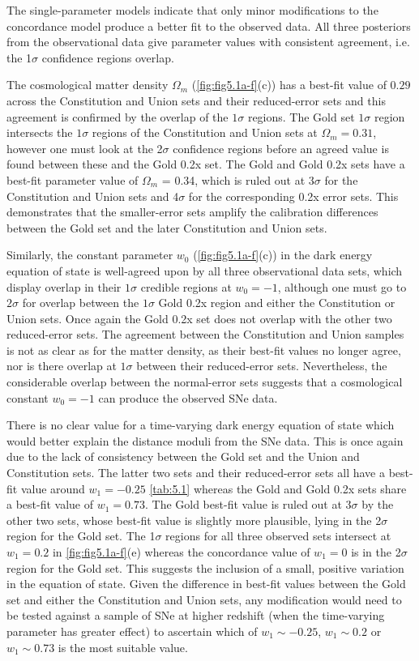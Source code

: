 The single-parameter models indicate that only minor modifications to the concordance model produce a better fit to the observed data. All three posteriors from the observational data give parameter values with consistent agreement, i.e. the 1$\sigma$ confidence regions overlap. 

The cosmological matter density $\Omega_m$ (\cref{fig:fig5.1a-f}(c)) has a best-fit value of $0.29$ across the Constitution and Union sets and their reduced-error sets and this agreement is confirmed by the overlap of the $1\sigma$ regions. The Gold set $1\sigma$ region intersects the $1\sigma$ regions of the Constitution and Union sets at $\Omega_m = 0.31$, however one must look at the 2$\sigma$ confidence regions before an agreed value is found between these and the Gold 0.2x set. The Gold and Gold 0.2x sets have a best-fit parameter value of $\Omega_m$ = 0.34, which is ruled out at 3$\sigma$ for the Constitution and Union sets and 4$\sigma$ for the corresponding 0.2x error sets. This demonstrates that the smaller-error sets amplify the calibration differences between the Gold set and the later Constitution and Union sets.

Similarly, the constant parameter $w_0$ (\cref{fig:fig5.1a-f}(c)) in the dark energy equation of state is well-agreed upon by all three observational data sets, which display overlap in their $1\sigma$ credible regions at $w_0 = -1$, although one must go to $2\sigma$ for overlap between the $1\sigma$ Gold 0.2x region and either the Constitution or Union sets. Once again the Gold 0.2x set does not overlap with the other two reduced-error sets. The agreement between the Constitution and Union samples is not as clear as for the matter density, as their best-fit values no longer agree, nor is there overlap at $1\sigma$ between their reduced-error sets. Nevertheless, the considerable overlap between the normal-error sets suggests that a cosmological constant $w_0 = -1$ can produce the observed SNe data.
   
There is no clear value for a time-varying dark energy equation of state which would better explain the distance moduli from the SNe data. This is once again due to the lack of consistency between the Gold set and the Union and Constitution sets. The latter two sets and their reduced-error sets all have a best-fit value around $w_1 = -0.25$ \cref{tab:5.1} whereas the Gold and Gold 0.2x sets share a best-fit value of $w_1 = 0.73$. The Gold best-fit value is ruled out at $3\sigma$ by the other two sets, whose best-fit value is slightly more plausible, lying in the 2$\sigma$ region for the Gold set. The 1$\sigma$ regions for all three observed sets intersect at $w_1 = 0.2$ in \cref{fig:fig5.1a-f}(e) whereas the concordance value of $w_1 = 0$ is in the 2$\sigma$ region for the Gold set. This suggests the inclusion of a small, positive variation in the equation of state. Given the difference in best-fit values between the Gold set and either the Constitution and Union sets, any modification would need to be tested against a sample of SNe at higher redshift (when the time-varying parameter has greater effect) to ascertain which of $w_1 \sim -0.25$, $w_1 \sim 0.2$ or $w_1 \sim 0.73$ is the most suitable value.
   
